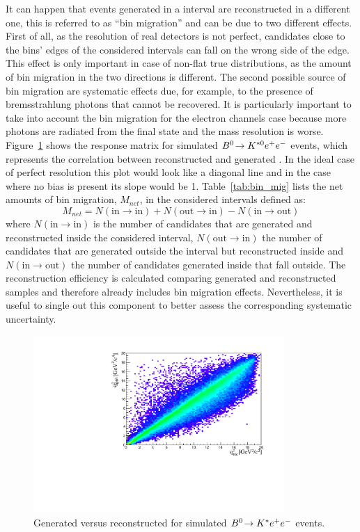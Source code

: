 It can happen that events generated in a \qsq interval are reconstructed in a different one,
this is referred to as ``bin migration'' and can be due to two different effects.
First of all, as the resolution of real detectors is not perfect, candidates close to the bins' edges
of the considered intervals can fall on the wrong side of the edge. This effect is only important
in case of non-flat true distributions, as the amount of bin migration in the two directions is different.
The second possible source of bin migration are systematic effects due, for example,
to the presence of bremsstrahlung photons that cannot be recovered.
It is particularly important to take into account the bin migration for the electron channels case 
because more photons are radiated from the final state and the mass resolution is worse.
Figure~\ref{fig:ee_bin_mig} shows the response matrix for simulated ${{B}^0}\!\rightarrow {\ensuremath{{K}^{*0}}}e^+ e^-$ events,
which represents the correlation between reconstructed and generated \qsq. In the ideal case of
perfect resolution this plot would look like a diagonal line and in the case where no bias is present
its slope would be 1. Table~\ref{tab:bin_mig} lists the net amounts of bin migration, $M_{net}$, 
in the considered \qsq intervals defined as:
%
\begin{equation}
M_{net} = N(\text{in} \to \text{in}) + N(\text{out} \to \text{in}) - N(\text{in} \to \text{out}) 
\end{equation}
%
\noindent
where $N(\text{in} \to \text{in})$ is the number of candidates that are generated and
reconstructed inside the considered interval, $N(\text{out} \to \text{in})$ the number of 
candidates that are generated outside the interval but reconstructed inside and
$N(\text{in} \to \text{out})$ the number of candidates generated inside that fall outside.
The reconstruction efficiency is calculated comparing generated and reconstructed samples
and therefore already includes bin migration effects. Nevertheless, it is useful to single
out this component to better assess the corresponding systematic uncertainty.
%
\begin{figure}[h!]
\centering
\includegraphics[width=0.85\textwidth]{RKst/figs/bin_mig.pdf}
\caption{Generated versus reconstructed \qsq for simulated ${{B}^0}\!\rightarrow {\ensuremath{{K}^*}}e^+ e^-$ events.}
\label{fig:ee_bin_mig}
\end{figure}
